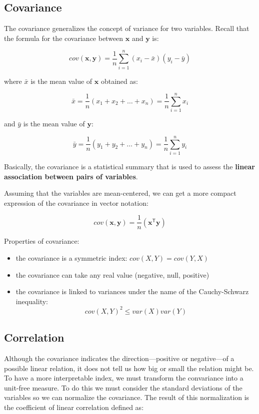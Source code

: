 \documentclass[]{book}
\providecommand{\tightlist}{%
  \setlength{\itemsep}{0pt}\setlength{\parskip}{0pt}}
\begin{document}
\hypertarget{covariance}{%
\subsection{Covariance}\label{covariance}}

The covariance generalizes the concept of variance for two variables. Recall that the formula for the covariance between \(\mathbf{x}\) and \(\mathbf{y}\) is:

\[
cov(\mathbf{x, y}) = \frac{1}{n} \sum_{i=1}^{n} (x_i - \bar{x}) (y_i - \bar{y})
\]

where \(\bar{x}\) is the mean value of \(\mathbf{x}\) obtained as:

\[
\bar{x} = \frac{1}{n} (x_1 + x_2 + \dots + x_n) = \frac{1}{n} \sum_{i = 1}^{n} x_i
\]

and \(\bar{y}\) is the mean value of \(\mathbf{y}\):

\[
\bar{y} = \frac{1}{n} (y_1 + y_2 + \dots + y_n) = \frac{1}{n} \sum_{i = 1}^{n} y_i
\]

Basically, the covariance is a statistical summary that is used to assess the
\textbf{linear association between pairs of variables}.

Assuming that the variables are mean-centered, we can get a more compact
expression of the covariance in vector notation:

\[
cov(\mathbf{x, y}) = \frac{1}{n} (\mathbf{x^{\mathsf{T}} y})
\]

Properties of covariance:

\begin{itemize}
\tightlist
\item
  the covariance is a symmetric index: \(cov(X,Y) = cov(Y,X)\)
\item
  the covariance can take any real value (negative, null, positive)
\item
  the covariance is linked to variances under the name of the Cauchy-Schwarz inequality:
  \[cov(X,Y)^2 \leq var(X) var(Y) \]
\end{itemize}

\hypertarget{correlation}{%
\subsection{Correlation}\label{correlation}}

Although the covariance indicates the direction---positive or negative---of a possible linear relation, it does not tell us how big or small the relation might be. To have a more interpretable index, we must transform the convariance into a unit-free measure. To do this we must consider the standard deviations of the variables so we can normalize the covariance. The result of this normalization is the coefficient of linear correlation defined as:
\end{document}
